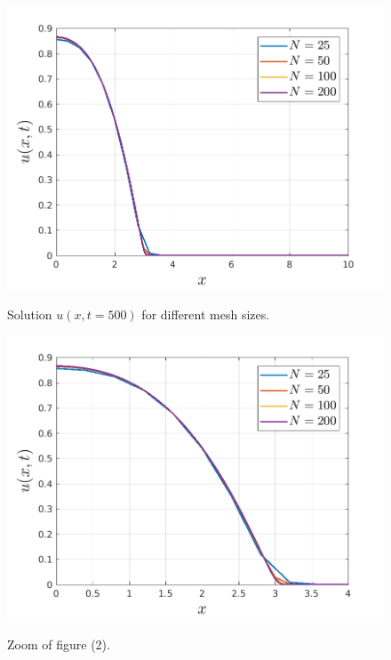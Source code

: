 \begin{questions}

\begin{solution}
\begin{figure}[H]
\centering     %
{\includegraphics[scale=0.7]{problem5.png}}
\caption{Solution $u(x,t=500)$ for different mesh sizes.}
\end{figure}
\begin{figure}[H]
\centering     %
{\includegraphics[scale=0.7]{problem5Zoom.png}}
\caption{Zoom of figure (2).}
\end{figure}
\end{solution}
\end{questions}
